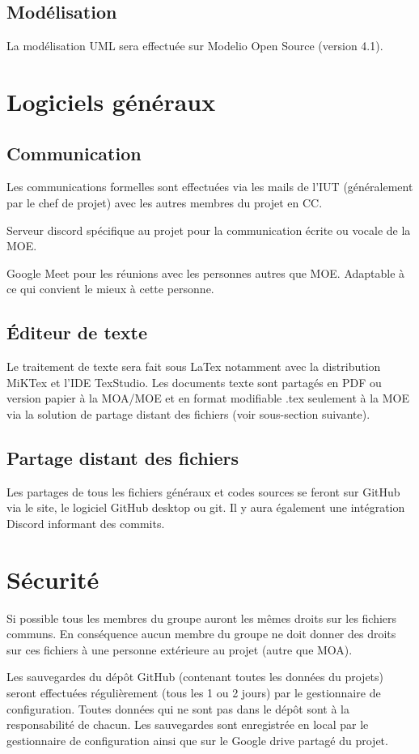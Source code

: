 \documentclass[12pt,a4paper,titlepage,openany, oneside]{report}
\begin{document}
        \subsection{Modélisation}
        La modélisation UML sera effectuée sur Modelio Open Source (version 4.1).

    \section{Logiciels généraux}
        \subsection{Communication}
        \par Les communications formelles sont effectuées via les mails de l’IUT (généralement par le chef
        de projet) avec les autres membres du projet en CC.

        \par Serveur discord spécifique au projet pour la communication écrite ou vocale de la MOE.
        \par Google Meet pour les réunions avec les personnes autres que MOE. Adaptable à ce qui
        convient le mieux à cette personne.

        \subsection{Éditeur de texte}
        Le traitement de texte sera fait sous LaTex notamment avec la distribution MiKTex et l'IDE TexStudio. Les documents texte sont partagés en PDF ou version papier à la MOA/MOE  et en format modifiable .tex seulement à la MOE via la solution de partage distant des fichiers (voir sous-section suivante).

        \subsection{Partage distant des fichiers}
        Les partages de tous les fichiers généraux et codes sources se feront sur GitHub via le site, le logiciel GitHub desktop ou git. Il y aura également une intégration Discord informant des commits.

    \section{Sécurité}
    \par Si possible tous les membres du groupe auront les mêmes droits sur les fichiers communs.
    En conséquence aucun membre du groupe ne doit donner des droits sur ces fichiers à une
    personne extérieure au projet (autre que MOA).
    \par Les sauvegardes du dépôt GitHub (contenant toutes les données du projets) seront effectuées
    régulièrement (tous les 1 ou 2 jours) par le gestionnaire de configuration. Toutes données qui ne
    sont pas dans le dépôt sont à la responsabilité de chacun.
    Les sauvegardes sont enregistrée en local par le gestionnaire de configuration ainsi que sur le Google drive partagé du projet.
\end{document}
